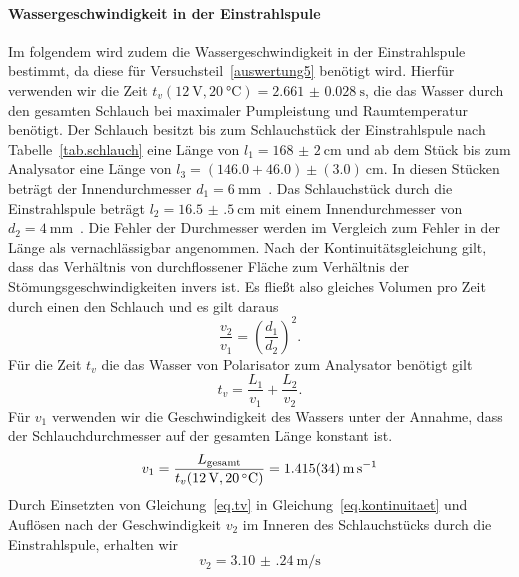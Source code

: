 \documentclass[paper=a4,
	fontsize=10pt,
	DIV=18,
	twocolumn,
	parskip=half
	]{scrartcl}
\numberwithin{equation}{section}    %
\begin{document}
\paragraph*{Wassergeschwindigkeit in der Einstrahlspule}
\label{wg}
Im folgendem wird zudem die Wassergeschwindigkeit in der Einstrahlspule bestimmt, da diese für Versuchsteil~\ref{auswertung5} benötigt wird.
Hierfür verwenden wir die Zeit $t_{v}(\SI{12}{\volt},\SI{20}{\celsius})= \SI{2.661(28)}{\second}$, die das Wasser durch den gesamten Schlauch bei maximaler Pumpleistung und Raumtemperatur benötigt. 
Der Schlauch besitzt bis zum Schlauchstück der Einstrahlspule nach Tabelle~\ref{tab.schlauch} eine Länge von $l_1 = \SI{168(2)}{\centi\meter}$ und ab dem Stück bis zum Analysator eine Länge von $l_3 = (146.0+46.0)\pm(3.0)\SI{}{\centi\meter}$. In diesen Stücken beträgt der Innendurchmesser $d_1 = \SI{6}{\milli\meter}$~\citep{anleitung}. Das Schlauchstück durch die Einstrahlspule beträgt $l_2 = \SI{16.5(5)}{\centi\meter}$ mit einem Innendurchmesser von $d_2 = \SI{4}{\milli\meter}$~\citep{anleitung}. Die Fehler der Durchmesser werden im Vergleich zum Fehler in der Länge als vernachlässigbar angenommen. 
Nach der Kontinuitätsgleichung gilt, dass das Verhältnis von durchflossener Fläche zum Verhältnis der Stömungsgeschwindigkeiten invers ist. Es fließt also gleiches Volumen pro Zeit durch einen den Schlauch und es gilt daraus
\begin{equation}
	\frac{v_2}{v_1} = \left(\frac{d_1}{d_2}\right)^2.
	\label{eq.kontinuitaet}
\end{equation}
Für die Zeit $t_v$ die das Wasser von Polarisator zum Analysator benötigt gilt
\begin{equation}
	t_v = \frac{L_1}{v_1} + \frac{L_2}{v_2}.
	\label{eq.tv}
\end{equation}
Für $v_1$ verwenden wir die Geschwindigkeit des Wassers unter der Annahme, dass der Schlauchdurchmesser auf der gesamten Länge konstant ist.
\begin{equation}
	v_1 = \frac{L_{\rm gesamt}}{t_{v}(\SI{12}{\volt},\SI{20}{\celsius})} = \SI{1.415(34)}{\meter\per\second}
\end{equation}
Durch Einsetzten von Gleichung~\eqref{eq.tv} in Gleichung~\eqref{eq.kontinuitaet} und Auflösen nach der Geschwindigkeit $v_2$ im Inneren des Schlauchstücks durch die Einstrahlspule, erhalten wir
\begin{equation}
	v_2 = \SI{3.10(24)}{\meter\per\second} %
\end{equation}
\end{document}
